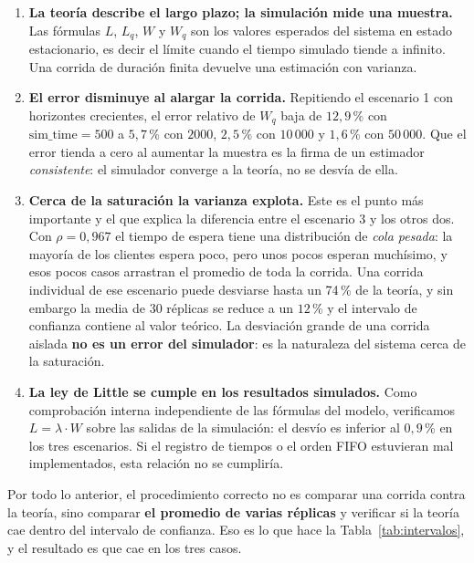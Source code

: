 \documentclass[11pt,a4paper]{article}
\begin{document}
\begin{enumerate}
    \item \textbf{La teoría describe el largo plazo; la simulación mide una muestra.}
    Las fórmulas $L$, $L_q$, $W$ y $W_q$ son los valores esperados del sistema en estado
    estacionario, es decir el límite cuando el tiempo simulado tiende a infinito. Una
    corrida de duración finita devuelve una estimación con varianza.

    \item \textbf{El error disminuye al alargar la corrida.} Repitiendo el escenario 1 con
    horizontes crecientes, el error relativo de $W_q$ baja de $12{,}9$\,\% con
    $\text{sim\_time} = 500$ a $5{,}7$\,\% con $2000$, $2{,}5$\,\% con $10\,000$ y
    $1{,}6$\,\% con $50\,000$. Que el error tienda a cero al aumentar la muestra es la
    firma de un estimador \emph{consistente}: el simulador converge a la teoría, no se
    desvía de ella.

    \item \textbf{Cerca de la saturación la varianza explota.} Este es el punto más
    importante y el que explica la diferencia entre el escenario 3 y los otros dos. Con
    $\rho = 0{,}967$ el tiempo de espera tiene una distribución de \emph{cola pesada}:
    la mayoría de los clientes espera poco, pero unos pocos esperan muchísimo, y esos
    pocos casos arrastran el promedio de toda la corrida. Una corrida individual de ese
    escenario puede desviarse hasta un 74\,\% de la teoría, y sin embargo la media de 30
    réplicas se reduce a un $12$\,\% y el intervalo de confianza contiene al valor
    teórico. La desviación grande de una corrida aislada \textbf{no es un error del
    simulador}: es la naturaleza del sistema cerca de la saturación.

    \item \textbf{La ley de Little se cumple en los resultados simulados.} Como
    comprobación interna independiente de las fórmulas del modelo, verificamos
    $L = \lambda \cdot W$ sobre las salidas de la simulación: el desvío es inferior al
    $0{,}9$\,\% en los tres escenarios. Si el registro de tiempos o el orden FIFO
    estuvieran mal implementados, esta relación no se cumpliría.
\end{enumerate}

Por todo lo anterior, el procedimiento correcto no es comparar una corrida contra la
teoría, sino comparar \textbf{el promedio de varias réplicas} y verificar si la teoría
cae dentro del intervalo de confianza. Eso es lo que hace la Tabla~\ref{tab:intervalos},
y el resultado es que cae en los tres casos.
\end{document}
